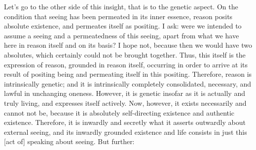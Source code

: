 Let's go to the other side of this insight,
that is to the genetic aspect.
On the condition that seeing has been
permeated in its inner essence,
reason posits absolute existence,
and permeates itself as positing.
I ask: were we intended to assume a seeing
and a permeatedness of this seeing,
apart from what we have here in reason itself
and on its basis?
I hope not, because then we would have two absolutes,
which certainly could not be brought together.
Thus, this itself is the expression of reason,
grounded in reason itself,
occurring in order to arrive at its result of
positing being and permeating itself in this positing.
Therefore, reason is intrinsically genetic;
and it is intrinsically completely consolidated,
necessary, and lawful in unchanging oneness.
However, it is genetic insofar as
it is actually and truly living,
and expresses itself actively.
Now, however, it exists necessarily and cannot not be,
because it is absolutely self-directing existence
and authentic existence.
Therefore, it is inwardly and secretly
what it asserts outwardly about external seeing,
and its inwardly grounded existence and life
consists in just this [act of] speaking about seeing.
But further:

